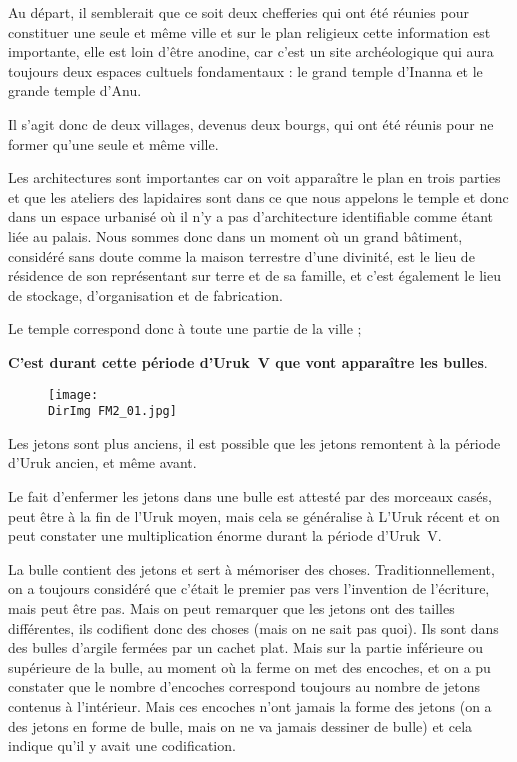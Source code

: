 \documentclass[a4paper,10pt]{article}
\newcommand{\DirImg}{../img/FaivreMartin/}
\begin{document}
Au départ, il semblerait que ce soit deux chefferies qui ont été réunies 
pour constituer une seule et même ville et sur le plan religieux cette 
information est importante, elle est loin d'être anodine, car c'est un 
site archéologique qui aura toujours deux espaces cultuels fondamentaux : 
le grand temple d'Inanna et le grande temple d'Anu.

Il s'agit donc de deux villages, devenus deux bourgs, qui ont été réunis 
pour ne former qu'une seule et même ville.

Les architectures sont importantes car on voit apparaître le plan en 
trois parties et que les ateliers des lapidaires sont dans ce que nous 
appelons le temple et donc dans un espace urbanisé où il n'y a pas 
d'architecture identifiable comme étant liée au palais. Nous sommes donc 
dans un moment où un grand bâtiment, considéré sans doute comme la maison 
terrestre d'une divinité, est le lieu de résidence de son représentant 
sur terre et de sa famille, et c'est également le lieu de stockage, 
d'organisation et de fabrication.

Le temple correspond donc à toute une partie de la ville ;

\textbf{C'est durant cette période d'Uruk~V que vont apparaître les bulles}.

\begin{figure}
  \centering
  \texttt{[image: \\DirImg FM2\_01.jpg]}
  \caption{}
  \label{}
\end{figure}

Les jetons sont plus anciens, il est possible que les jetons remontent 
à la période d'Uruk ancien, et même avant.

Le fait d'enfermer les jetons dans une bulle est attesté par des 
morceaux casés, peut être à la fin de l'Uruk moyen, mais cela se 
généralise à L'Uruk récent et on peut constater une multiplication 
énorme durant la période d'Uruk~V.

La bulle contient des jetons et sert à mémoriser des choses. 
Traditionnellement, on a toujours considéré que c'était le premier 
pas vers l'invention de l'écriture, mais peut être pas. Mais on peut 
remarquer que les jetons ont des tailles différentes, ils codifient 
donc des choses (mais on ne sait pas quoi). Ils sont dans des bulles 
d'argile fermées par un cachet plat. Mais sur la partie inférieure 
ou supérieure de la bulle, au moment où la ferme on met des encoches, 
et on a pu constater que le nombre d'encoches correspond toujours au 
nombre de jetons contenus à l'intérieur. Mais ces encoches n'ont jamais 
la forme des jetons (on a des jetons en forme de bulle, mais on ne va 
jamais dessiner de bulle) et cela indique qu'il y avait une codification.
\end{document}
